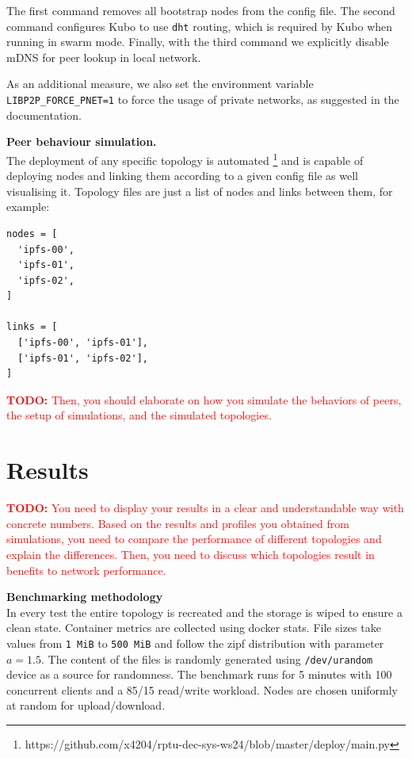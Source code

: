 The first command removes all bootstrap nodes from the config file. The second
command configures Kubo to use \verb|dht| routing, which is required by Kubo
when running in swarm mode. Finally, with the third command we explicitly
disable mDNS for peer lookup in local network.

As an additional measure, we also set the environment variable
\verb|LIBP2P_FORCE_PNET=1| to force the usage of private networks, as suggested
in the documentation.

\textbf{Peer behaviour simulation.}\\
The deployment of any specific topology is automated
\footnote{https://github.com/x4204/rptu-dec-sys-ws24/blob/master/deploy/main.py}
and is capable of deploying nodes and linking them according to a given config
file as well visualising it. Topology files are just a list of nodes and links
between them, for example:
\begin{lstlisting}
nodes = [
  'ipfs-00',
  'ipfs-01',
  'ipfs-02',
]

links = [
  ['ipfs-00', 'ipfs-01'],
  ['ipfs-01', 'ipfs-02'],
]
\end{lstlisting}

\textcolor{red}{
  \textbf{TODO:} Then, you should elaborate on how you simulate the behaviors
  of peers, the setup of simulations, and the simulated topologies.
}


\section{Results}

\textcolor{red}{
  \textbf{TODO:} You need to display your results in a clear and understandable
  way with concrete numbers. Based on the results and profiles you obtained
  from simulations, you need to compare the performance of different topologies
  and explain the differences. Then, you need to discuss which topologies
  result in benefits to network performance.
}

\textbf{Benchmarking methodology}\\
In every test the entire topology is recreated and the storage is wiped to
ensure a clean state. Container metrics are collected using docker stats. File
sizes take values from \verb|1 MiB| to \verb|500 MiB| and follow the zipf
distribution with parameter $a=1.5$. The content of the files is randomly
generated using \verb|/dev/urandom| device as a source for randomness. The
benchmark runs for 5 minutes with 100 concurrent clients and a 85/15 read/write
workload. Nodes are chosen uniformly at random for upload/download.

